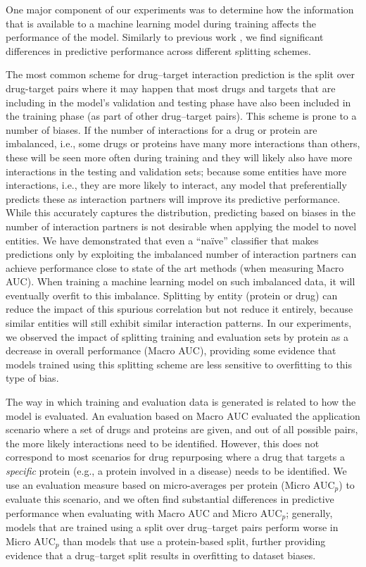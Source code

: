 \documentclass{bioinfo}
\renewcommand{\cite}{\citep}
\begin{document}
One major component of our experiments was to determine how the
information that is available to a machine learning model during
training affects the performance of the model. Similarly to previous
work \cite{}, we find significant differences in predictive
performance across different splitting schemes.

The most common scheme for drug--target interaction prediction is the
split over drug-target pairs \cite{Survey2018} where it may happen
that most drugs and targets that are including in the model's
validation and testing phase have also been included in the training
phase (as part of other drug--target pairs). This scheme is prone to a
number of biases. If the number of interactions for a drug or protein
are imbalanced, i.e., some drugs or proteins have many more
interactions than others, these will be seen more often during
training and they will likely also have more interactions in the
testing and validation sets; because some entities have more
interactions, i.e., they are more likely to interact, any model that
preferentially predicts these as interaction partners will improve its
predictive performance. While this accurately captures the
distribution, predicting based on biases in the number of interaction
partners is not desirable when applying the model to novel
entities. We have demonstrated that even a ``na\"ive'' classifier that
makes predictions only by exploiting the imbalanced number of
interaction partners can achieve performance close to state of the art
methods (when measuring Macro AUC). When training a machine learning
model on such imbalanced data, it will eventually overfit to this
imbalance.  Splitting by entity (protein or drug) can reduce the
impact of this spurious correlation but not reduce it entirely,
because similar entities will still exhibit similar interaction
patterns. In our experiments, we observed the impact of splitting
training and evaluation sets by protein as a decrease in overall
performance (Macro AUC), providing some evidence that models trained
using this splitting scheme are less sensitive to overfitting to this
type of bias.

The way in which training and evaluation data is generated is related
to how the model is evaluated. An evaluation based on Macro AUC
evaluated the application scenario where a set of drugs and proteins
are given, and out of all possible pairs, the more likely interactions
need to be identified. However, this does not correspond to most
scenarios for drug repurposing where a drug that targets a {\em
  specific} protein (e.g., a protein involved in a disease) needs to
be identified. We use an evaluation measure based on micro-averages
per protein (Micro AUC$_p$) to evaluate this scenario, and we often
find substantial differences in predictive performance when evaluating
with Macro AUC and Micro AUC$_p$; generally, models that are trained
using a split over drug--target pairs perform worse in Micro AUC$_p$
than models that use a protein-based split, further providing evidence
that a drug--target split results in overfitting to dataset biases.
\end{document}
